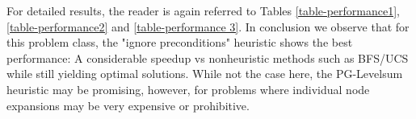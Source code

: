 \documentclass{article}
\theoremstyle{plain}
\theoremstyle{definition}
\theoremstyle{remark}
\begin{document}
For detailed results, the reader is again referred to Tables \ref{table-performance1}, \ref{table-performance2} and \ref{table-performance 3}. In conclusion we observe that for this problem class, the "ignore preconditions" heuristic shows the best performance: A considerable speedup vs nonheuristic methods such as BFS/UCS while still yielding optimal solutions. While not the case here, the PG-Levelsum heuristic may be promising, however, for problems where individual node expansions may be very expensive or prohibitive.


\end{document}

